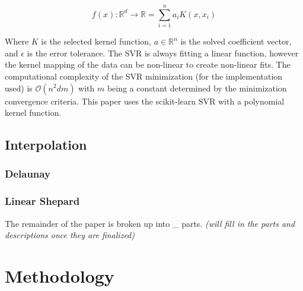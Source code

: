 \documentclass{scspaperproc}
\theoremstyle{scsthe}
\begin{document}
$$ f(x) : \mathbb{R}^d \rightarrow \mathbb{R} = \sum_{i=1}^{n}a_i
K(x,x_i) $$




Where $K$ is the selected kernel function, $a \in \mathbb{R}^n$ is the
solved coefficient vector, and $\epsilon$ is the error tolerance. The
SVR is always fitting a linear function, however the kernel mapping of
the data can be non-linear to create non-linear fits. The
computational complexity of the SVR minimization (for the
implementation used) is $\mathcal{O}(n^2dm)$ with $m$ being a constant
determined by the minimization convergence criteria. This paper uses
the scikit-learn SVR \cite{scikit-learn} with a polynomial kernel
function.

\subsection{Interpolation}


\subsubsection{Delaunay}
\subsubsection{Linear Shepard}

The remainder of the paper is broken up into \_ parts. \textit{(will
  fill in the parts and descriptions once they are finalized)}



\section{Methodology}
\end{document}
